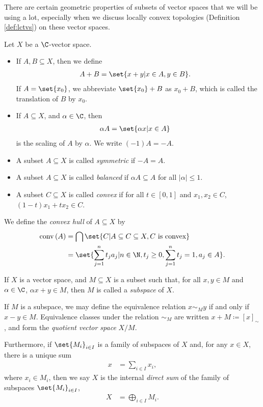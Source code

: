 There are certain geometric properties of subsets of vector spaces that we will be using a lot, especially when we discuss locally convex topologies (Definition \ref{def:lctvs}) on these vector spaces.
\begin{definition}\label{def:vector_space_subset_operations}
  Let $X$ be a $\C$-vector space.
  \begin{itemize}
    \item If $A,B\subseteq X$, then we define
      \begin{align*}
        A + B &= \set{x + y | x\in A,y\in B}.
      \end{align*}
      If $A = \set{x_0}$, we abbreviate $\set{x_0} + B$ as $x_0 + B$, which is called the translation of $B$ by $x_0$.
    \item If $A\subseteq X$, and $\alpha\in \C$, then
      \begin{align*}
        \alpha A &= \set{\alpha x | x\in A}
      \end{align*}
      is the scaling of $A$ by $\alpha$. We write $(-1)A = -A$.
    \item A subset $A\subseteq X$ is called \textit{symmetric} if $-A = A$.
    \item A subset $A\subseteq X$ is called \textit{balanced} if $\alpha A\subseteq A$ for all $\left\vert \alpha \right\vert\leq 1$.
    \item A subset $C\subseteq X$ is called \textit{convex} if for all $t\in [0,1]$ and $x_1,x_2\in C$, $\left(1-t\right)x_1 + tx_2 \in C$.
  \end{itemize}
  We define the \textit{convex hull} of $A\subseteq X$ by
  \begin{align*}
    \operatorname{conv}\left(A\right) &= \bigcap\set{C | A\subseteq C\subseteq X,C\text{ is convex}}\\
                                      &= \set{\sum_{j=1}^{n}t_ja_j | n\in\N,t_j\geq 0,\sum_{j=1}^{n}t_j = 1,a_j\in A}.
  \end{align*}
\end{definition}
\begin{definition}\label{def:subspace_quotient_space_direct_sum}
  If $X$ is a vector space, and $M\subseteq X$ is a subset such that, for all $x,y\in M$ and $\alpha\in \C$, $\alpha x + y\in M$, then $M$ is called a \textit{subspace} of $X$.\newline

  If $M$ is a subspace, we may define the equivalence relation $x\sim_{M} y$ if and only if $x-y\in M$. Equivalence classes under the relation $\sim_{M}$ are written $x + M\coloneq \left[x\right]_{\sim}$, and form the \textit{quotient vector space} $X/M$.\newline

  Furthermore, if $\set{M_i}_{i\in I}$ is a family of subspaces of $X$ and, for any $x\in X$, there is a unique sum
  \begin{align*}
    x &= \sum_{i\in I}x_i,
  \end{align*}
  where $x_i\in M_i$, then we say $X$ is the internal \textit{direct sum} of the family of subspaces $\set{M_i}_{i\in I}$,
  \begin{align*}
    X &= \bigoplus_{i\in I}M_i.
  \end{align*}
\end{definition}
